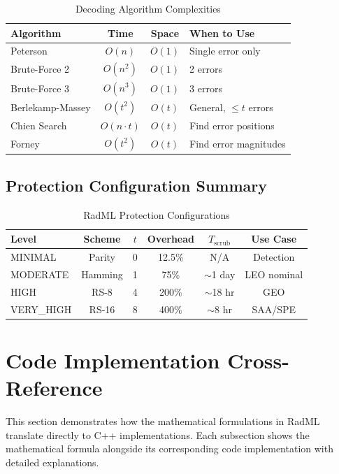 \documentclass[11pt,a4paper]{article}
\begin{document}
\begin{table}[htbp]
\centering
\caption{Decoding Algorithm Complexities}
\begin{tabular}{@{}lccl@{}}
\toprule
\textbf{Algorithm} & \textbf{Time} & \textbf{Space} & \textbf{When to Use} \\ \midrule
Peterson & $O(n)$ & $O(1)$ & Single error only \\
Brute-Force 2 & $O(n^2)$ & $O(1)$ & 2 errors \\
Brute-Force 3 & $O(n^3)$ & $O(1)$ & 3 errors \\
Berlekamp-Massey & $O(t^2)$ & $O(t)$ & General, $\leq t$ errors \\
Chien Search & $O(n \cdot t)$ & $O(t)$ & Find error positions \\
Forney & $O(t^2)$ & $O(t)$ & Find error magnitudes \\ \bottomrule
\end{tabular}
\end{table}

\subsection{Protection Configuration Summary}

\begin{table}[htbp]
\centering
\caption{RadML Protection Configurations}
\begin{tabular}{@{}lccccc@{}}
\toprule
\textbf{Level} & \textbf{Scheme} & $t$ & \textbf{Overhead} & $T_{\text{scrub}}$ & \textbf{Use Case} \\ \midrule
MINIMAL & Parity & 0 & 12.5\% & N/A & Detection \\
MODERATE & Hamming & 1 & 75\% & $\sim$1 day & LEO nominal \\
HIGH & RS-8 & 4 & 200\% & $\sim$18 hr & GEO \\
VERY\_HIGH & RS-16 & 8 & 400\% & $\sim$8 hr & SAA/SPE \\ \bottomrule
\end{tabular}
\end{table}

\newpage
\section{Code Implementation Cross-Reference}

This section demonstrates how the mathematical formulations in RadML translate directly to C++ implementations. Each subsection shows the mathematical formula alongside its corresponding code implementation with detailed explanations.
\end{document}
